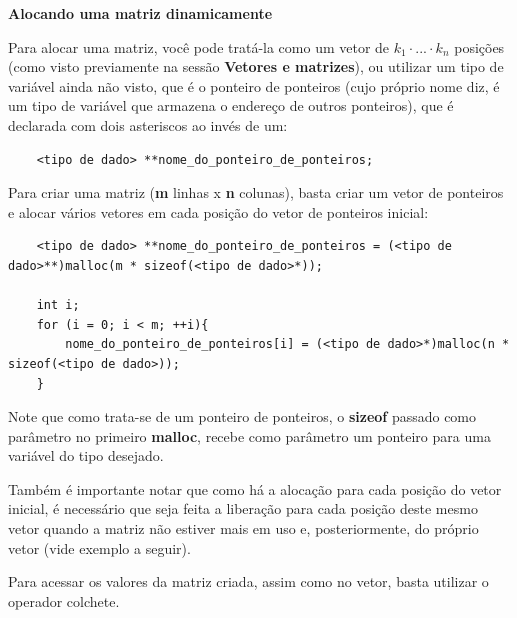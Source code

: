 \documentclass[12pt]{article}
\newcommand\tab[1][1cm]{\hspace*{#1}}
\begin{document}
\hspace{2cm}
\par\tab\textbf{Alocando uma matriz dinamicamente}

\par\tab Para alocar uma matriz, você pode tratá-la como um vetor de $k_1 \cdot ... \cdot k_n$ posições (como visto previamente na sessão \textbf{Vetores e matrizes}), ou utilizar um tipo de variável ainda não visto, que é o ponteiro de ponteiros (cujo próprio nome diz, é um tipo de variável que armazena o endereço de outros ponteiros), que é declarada com dois asteriscos ao invés de um:

\begin{lstlisting}
    <tipo de dado> **nome_do_ponteiro_de_ponteiros;
\end{lstlisting}

\par\tab Para criar uma matriz (\textbf{m} linhas x \textbf{n} colunas), basta criar um vetor de ponteiros e alocar vários vetores em cada posição do vetor de ponteiros inicial:

\hspace{0.25cm}
\begin{lstlisting}
    <tipo de dado> **nome_do_ponteiro_de_ponteiros = (<tipo de dado>**)malloc(m * sizeof(<tipo de dado>*));
    
    int i;
    for (i = 0; i < m; ++i){
        nome_do_ponteiro_de_ponteiros[i] = (<tipo de dado>*)malloc(n * sizeof(<tipo de dado>));
    }
\end{lstlisting}

\hspace{0.25cm}
\begin{tcolorbox}[colback=yellow!5!white,colframe=yellow!75!black,title=Atenção!]
  \par\tab Note que como trata-se de um ponteiro de ponteiros, o \textbf{sizeof} passado como parâmetro no primeiro \textbf{malloc}, recebe como parâmetro um ponteiro para uma variável do tipo desejado.
  \par\tab Também é importante notar que como há a alocação para cada posição do vetor inicial, é necessário que seja feita a liberação para cada posição deste mesmo vetor quando a matriz não estiver mais em uso e, posteriormente, do próprio vetor (vide exemplo a seguir).
\end{tcolorbox}

\par\tab Para acessar os valores da matriz criada, assim como no vetor, basta utilizar o operador colchete.
\end{document}
